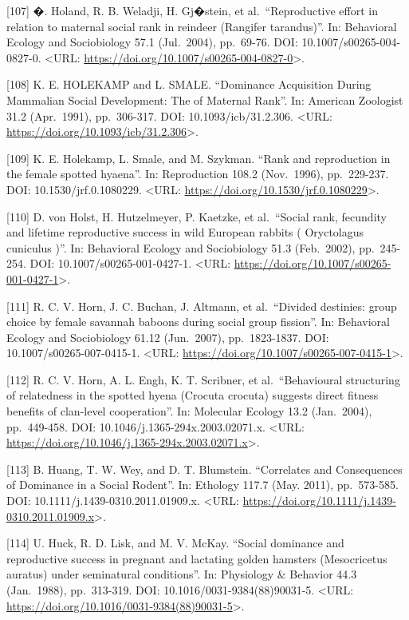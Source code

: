 \documentclass[
]{article}
\begin{document}
{[}107{]} �. Holand, R. B. Weladji, H. Gj�stein, et al.~``Reproductive
effort in relation to maternal social rank in reindeer (Rangifer
tarandus)''. In: Behavioral Ecology and Sociobiology 57.1 (Jul.~2004),
pp.~69-76. DOI: 10.1007/s00265-004-0827-0. \textless URL:
\url{https://doi.org/10.1007/s00265-004-0827-0}\textgreater.

{[}108{]} K. E. HOLEKAMP and L. SMALE. ``Dominance Acquisition During
Mammalian Social Development: The of Maternal Rank''. In: American
Zoologist 31.2 (Apr.~1991), pp.~306-317. DOI: 10.1093/icb/31.2.306.
\textless URL: \url{https://doi.org/10.1093/icb/31.2.306}\textgreater.

{[}109{]} K. E. Holekamp, L. Smale, and M. Szykman. ``Rank and
reproduction in the female spotted hyaena''. In: Reproduction 108.2
(Nov.~1996), pp.~229-237. DOI: 10.1530/jrf.0.1080229. \textless URL:
\url{https://doi.org/10.1530/jrf.0.1080229}\textgreater.

{[}110{]} D. von Holst, H. Hutzelmeyer, P. Kaetzke, et al.~``Social
rank, fecundity and lifetime reproductive success in wild European
rabbits ( Oryctolagus cuniculus )''. In: Behavioral Ecology and
Sociobiology 51.3 (Feb.~2002), pp.~245-254. DOI:
10.1007/s00265-001-0427-1. \textless URL:
\url{https://doi.org/10.1007/s00265-001-0427-1}\textgreater.

{[}111{]} R. C. V. Horn, J. C. Buchan, J. Altmann, et al.~``Divided
destinies: group choice by female savannah baboons during social group
fission''. In: Behavioral Ecology and Sociobiology 61.12 (Jun.~2007),
pp.~1823-1837. DOI: 10.1007/s00265-007-0415-1. \textless URL:
\url{https://doi.org/10.1007/s00265-007-0415-1}\textgreater.

{[}112{]} R. C. V. Horn, A. L. Engh, K. T. Scribner, et
al.~``Behavioural structuring of relatedness in the spotted hyena
(Crocuta crocuta) suggests direct fitness benefits of clan-level
cooperation''. In: Molecular Ecology 13.2 (Jan.~2004), pp.~449-458. DOI:
10.1046/j.1365-294x.2003.02071.x. \textless URL:
\url{https://doi.org/10.1046/j.1365-294x.2003.02071.x}\textgreater.

{[}113{]} B. Huang, T. W. Wey, and D. T. Blumstein. ``Correlates and
Consequences of Dominance in a Social Rodent''. In: Ethology 117.7 (May.
2011), pp.~573-585. DOI: 10.1111/j.1439-0310.2011.01909.x.
\textless URL:
\url{https://doi.org/10.1111/j.1439-0310.2011.01909.x}\textgreater.

{[}114{]} U. Huck, R. D. Lisk, and M. V. McKay. ``Social dominance and
reproductive success in pregnant and lactating golden hamsters
(Mesocricetus auratus) under seminatural conditions''. In: Physiology \&
Behavior 44.3 (Jan.~1988), pp.~313-319. DOI:
10.1016/0031-9384(88)90031-5. \textless URL:
\url{https://doi.org/10.1016/0031-9384(88)90031-5}\textgreater.
\end{document}
